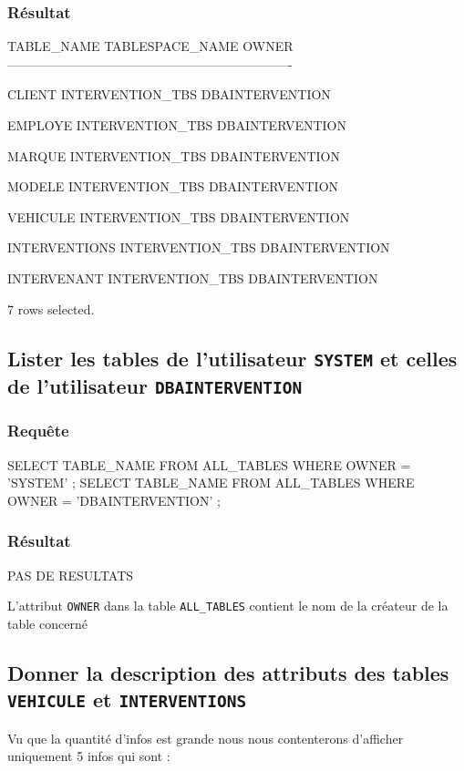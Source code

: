 \documentclass[•]{article}
\begin{document}
\subsubsection{Résultat}
\begin{sql}
TABLE_NAME                     TABLESPACE_NAME				OWNER 
-------------------------------------------------------------------

CLIENT                         INTERVENTION_TBS				DBAINTERVENTION

EMPLOYE                        INTERVENTION_TBS				DBAINTERVENTION

MARQUE                         INTERVENTION_TBS				DBAINTERVENTION

MODELE                         INTERVENTION_TBS				DBAINTERVENTION

VEHICULE                       INTERVENTION_TBS				DBAINTERVENTION

INTERVENTIONS                  INTERVENTION_TBS				DBAINTERVENTION

INTERVENANT                    INTERVENTION_TBS				DBAINTERVENTION


7 rows selected.
\end{sql}

\subsection{Lister les tables de l’utilisateur \texttt{SYSTEM} et celles de l’utilisateur \texttt{DBAINTERVENTION}}
\subsubsection{Requête}
\begin{sql}
SELECT TABLE_NAME  FROM ALL_TABLES WHERE OWNER = 'SYSTEM' ;
SELECT TABLE_NAME  FROM ALL_TABLES WHERE OWNER = 'DBAINTERVENTION' ;\end{sql}
\subsubsection{Résultat}
\begin{sql}
PAS DE RESULTATS
\end{sql}
L'attribut \texttt{OWNER} dans la table \texttt{ALL\_TABLES} contient le nom de la créateur de la table concerné

\subsection{Donner la description des attributs des tables \texttt{VEHICULE} et \texttt{INTERVENTIONS}}
Vu que la quantité d'infos est grande nous nous contenterons d'afficher uniquement 5 infos qui sont :
\end{document}
